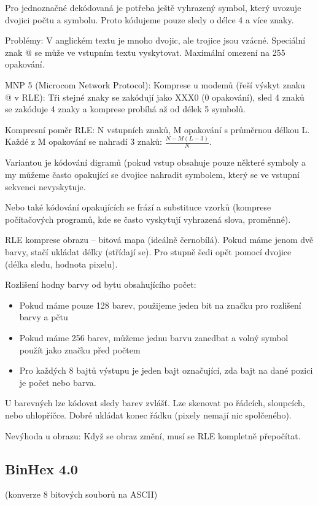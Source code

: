 \documentclass[a4paper, 11pt]{report}
\begin{document}
Pro jednoznačné dekódovaná je potřeba ještě vyhrazený symbol, který uvozuje dvojici počtu a symbolu. Proto kódujeme pouze sledy o délce 4 a více znaky.

Problémy: V anglickém textu je mnoho dvojic, ale trojice jsou vzácné. Speciální znak @ se může ve vstupním textu vyskytovat. Maximální omezení na 255 opakování.

MNP 5 (Microcom Network Protocol): Komprese u modemů (řeší výskyt znaku @ v RLE): Tři stejné znaky se zakódují jako XXX0 (0 opakování), sled 4 znaků se zakóduje 4 znaky a komprese probíhá až od délek 5 symbolů.

Kompresní poměr RLE: N vstupních znaků, M opakování s průměrnou délkou L. Každé z M opakování se nahradí 3 znaků: $\frac{N - M(L-3)}{N}$.

Variantou je kódování digramů (pokud vstup obsahuje pouze některé symboly a my můžeme často opakující se dvojice nahradit symbolem, který se ve vstupní sekvenci nevyskytuje.

Nebo také kódování opakujících se frází a substituce vzorků (komprese počítačových programů, kde se často vyskytují vyhrazená slova, proměnné).

RLE komprese obrazu -- bitová mapa (ideálně černobílá). Pokud máme jenom dvě barvy, stačí ukládat délky (střídají se). Pro stupně šedi opět pomocí dvojice (délka sledu, hodnota pixelu).

Rozlišení hodny barvy od bytu obsahujícího počet:
\begin{itemize}
	\item Pokud máme pouze 128 barev, použijeme jeden bit na značku pro rozlišení barvy a pčtu
	\item Pokud máme 256 barev, můžeme jednu barvu zanedbat a volný symbol použít jako značku před počtem
	\item Pro každých 8 bajtů výstupu je jeden bajt označující, zda bajt na dané pozici je počet nebo barva.
\end{itemize}

U barevných lze kódovat sledy barev zvlášť. Lze skenovat po řádcích, sloupcích, nebo uhlopříčce. Dobré ukládat konec řádku (pixely  nemají nic spolčeného).

Nevýhoda u obrazu: Když se obraz změní, musí se RLE kompletně přepočítat.

\subsection{BinHex 4.0}
(konverze 8 bitových souborů na ASCII)
\end{document}
